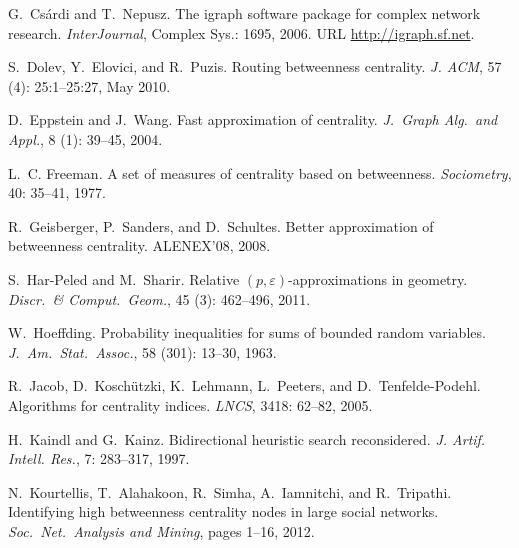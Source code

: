 \begin{thebibliography}{33}
G.~Cs\'{a}rdi and T.~Nepusz.
\newblock The igraph software package for complex network research.
\newblock \emph{InterJournal}, Complex Sys.: 1695, 2006.
\newblock URL \url{http://igraph.sf.net}.

S.~Dolev, Y.~Elovici, and R.~Puzis.
\newblock Routing betweenness centrality.
\newblock \emph{J. ACM}, 57 (4): 25:1--25:27, May 2010.

D.~Eppstein and J.~Wang.
\newblock Fast approximation of centrality.
\newblock \emph{J.~Graph Alg.~and Appl.}, 8
  (1): 39--45, 2004.

L.~C. Freeman.
\newblock A set of measures of centrality based on betweenness.
\newblock \emph{Sociometry}, 40: 35--41, 1977.

R.~Geisberger, P.~Sanders, and D.~Schultes.
\newblock Better approximation of betweenness centrality.
\newblock ALENEX'08, 2008.

S.~Har-Peled and M.~Sharir.
\newblock Relative $(p,\varepsilon)$-approximations in geometry.
\newblock \emph{Discr.~\& Comput.~Geom.}, 45 (3):
  462--496, 2011.

W.~Hoeffding.
\newblock Probability inequalities for sums of bounded random variables.
\newblock \emph{J.~Am.~Stat.~Assoc.}, 58
  (301): 13--30, 1963.

R.~Jacob, D.~Kosch{\"u}tzki, K.~Lehmann, L.~Peeters, and D.~Tenfelde-Podehl.
\newblock Algorithms for centrality indices.
\newblock \emph{LNCS}, 3418: 62--82, 2005.

H.~Kaindl and G.~Kainz.
\newblock Bidirectional heuristic search reconsidered.
\newblock \emph{J. Artif. Intell. Res.}, 7: 283--317, 1997.

N.~Kourtellis, T.~Alahakoon, R.~Simha, A.~Iamnitchi, and R.~Tripathi.
\newblock Identifying high betweenness centrality nodes in large social
  networks.
\newblock \emph{Soc.~Net.~Analysis and Mining}, pages 1--16, 2012.


\end{thebibliography}
